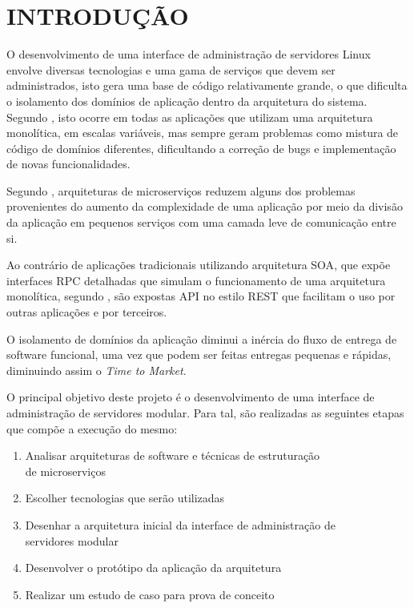 \chapter{INTRODUÇÃO}
\label{chp:intro}

O desenvolvimento de uma interface de administração de servidores Linux
envolve diversas tecnologias e uma gama de serviços que devem ser
administrados, isto gera uma base de código relativamente grande, o que
dificulta o isolamento dos domínios de aplicação dentro da arquitetura
do sistema. Segundo , isto ocorre em todas as aplicações
que utilizam uma arquitetura monolítica, em escalas variáveis, mas sempre
geram problemas como mistura de código de domínios diferentes, dificultando
a correção de bugs e implementação de novas funcionalidades.

Segundo , arquiteturas de microserviços reduzem
alguns dos problemas provenientes do aumento da complexidade de uma aplicação
por meio da divisão da aplicação em pequenos serviços com uma camada leve
de comunicação entre si.

Ao contrário de aplicações tradicionais utilizando arquitetura
\ac{SOA}, que expõe interfaces \ac{RPC} detalhadas que simulam o funcionamento
de uma arquitetura monolítica, segundo , são expostas
\ac{API} no estilo \ac{REST} que facilitam o uso por outras aplicações e
por terceiros.

O isolamento de domínios da aplicação diminui a inércia do fluxo de entrega
de software funcional, uma vez que podem ser feitas entregas pequenas e
rápidas, diminuindo assim o \emph{Time to Market}.

O principal objetivo deste projeto é o desenvolvimento de uma interface
de administração de servidores modular. Para tal, são realizadas as seguintes
etapas que compõe a execução do mesmo:

\begin{enumerate}
  \item Analisar arquiteturas de software e técnicas de estruturação \\
    de microserviços
  \item Escolher tecnologias que serão utilizadas
  \item Desenhar a arquitetura inicial da interface de administração de \\
    servidores modular
  \item Desenvolver o protótipo da aplicação da arquitetura
  \item Realizar um estudo de caso para prova de conceito
\end{enumerate}

